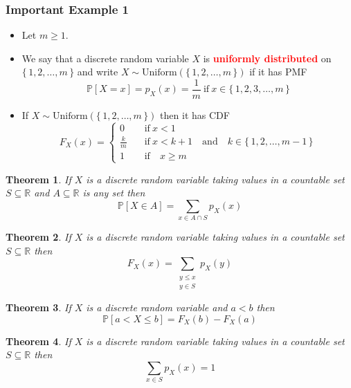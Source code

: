 \documentclass{article}
\newcommand{\PP}{\mathbb{P}}
\newcommand{\R}{\mathbb{R}}
\newcommand{\bfred}[1]{\textcolor{red}{\textbf{#1}}}
\theoremstyle{plain}
\newtheorem{thm}{Theorem}[section]
\theoremstyle{definition}
\theoremstyle{remark}
\begin{document}
\subsubsection*{Important Example 1}

\begin{tcolorbox}[title = Uniform Distribution, colback = SkyBlue!5!white,colframe = SkyBlue!75!black]
    \begin{itemize}
        \item Let $m \geq 1$.
        \item We say that a discrete random variable $X$ is \bfred{uniformly distributed} on $\{\, 1, 2, \dotsc, m \,\}$ and write $X \sim \text{Uniform}(\{\, 1, 2, \dotsc, m \,\})$ if it has PMF \[\PP[X=x] = p_X(x) = \frac{1}{m} \ \text{if} \ x \in \{\,1, 2, 3, \dotsc, m\,\}\]
        \item If $X \sim \text{Uniform}(\{\, 1, 2, \dotsc, m \,\})$ then it has CDF \[F_X(x) = 
        \begin{cases}
            0 \quad &\text{if} \ x < 1 \\
            \frac{k}{m} \quad &\text{if} \ x < k + 1 \quad \text{and} \quad k \in \{\,1, 2, \dotsc, m-1\,\} \\
            1 \quad &\text{if} \quad x \geq m
        \end{cases}\]
    \end{itemize}
\end{tcolorbox}

\begin{thm}
    If $X$ is a discrete random variable taking values in a countable set $S \subseteq \R$ and $A \subseteq \R$ is any set then \[\PP[X \in A] = \sum_{x \in A \cap S}p_X(x)\]
\end{thm}
    
\begin{thm}
    If $X$ is a discrete random variable taking values in a countable set $S \subseteq \R$ then \[F_X(x) = \sum_{\substack{y \leq x \\ y \in S}} p_X(y)\]
\end{thm}

\begin{thm}
    If $X$ is a discrete random variable and $a < b$ then \[\PP[a < X \leq b] = F_X(b) - F_X(a)\]
\end{thm}

\begin{thm}
    If $X$ is a discrete random variable taking values in a countable set $S \subseteq \R$ then \[\sum_{x \in S} p_X(x) = 1\]
\end{thm}
\end{document}
